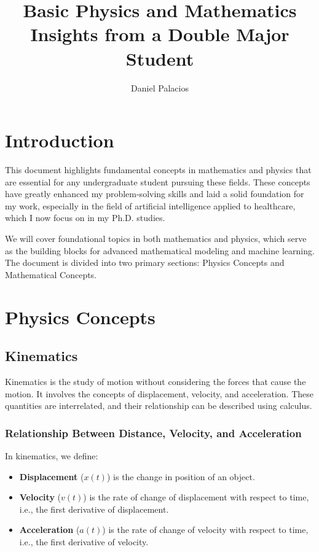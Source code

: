 \documentclass{article}
\title{Basic Physics and Mathematics \\[0.2cm] \large Insights from a Double Major Student}
\author{Daniel Palacios}
\date{}
\begin{document}
\maketitle
\tableofcontents
\newpage

\section*{Introduction}

This document highlights fundamental concepts in mathematics and physics that are essential for any undergraduate student pursuing these fields. These concepts have greatly enhanced my problem-solving skills and laid a solid foundation for my work, especially in the field of artificial intelligence applied to healthcare, which I now focus on in my Ph.D. studies.

We will cover foundational topics in both mathematics and physics, which serve as the building blocks for advanced mathematical modeling and machine learning. The document is divided into two primary sections: Physics Concepts and Mathematical Concepts.

\section{Physics Concepts}

\subsection{Kinematics}

Kinematics is the study of motion without considering the forces that cause the motion. It involves the concepts of displacement, velocity, and acceleration. These quantities are interrelated, and their relationship can be described using calculus.

\subsubsection*{Relationship Between Distance, Velocity, and Acceleration}

In kinematics, we define:
\begin{itemize}
    \item \textbf{Displacement} (\(x(t)\)) is the change in position of an object.
    \item \textbf{Velocity} (\(v(t)\)) is the rate of change of displacement with respect to time, i.e., the first derivative of displacement.
    \item \textbf{Acceleration} (\(a(t)\)) is the rate of change of velocity with respect to time, i.e., the first derivative of velocity.
\end{itemize}
\end{document}
